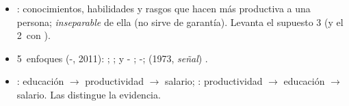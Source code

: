\documentclass{article}
\begin{document}
\begin{columnas}
\begin{itemize}
\item {}: conocimientos, habilidades y rasgos que hacen más productiva a una persona; \emph{inseparable} de ella (no sirve de garantía). Levanta el supuesto 3 (y el 2~con ).
\item 5~enfoques (-, 2011): ; ;  y - ; -;  (1973, \emph{señal}) .
\item {}: educación $\to$ productividad $\to$ salario; : productividad $\to$ educación $\to$ salario. Las distingue la evidencia.
\end{itemize}


\end{columnas}
\end{document}

